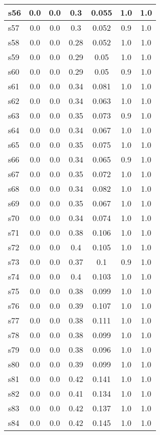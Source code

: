 \documentclass{article}
\begin{document}
\begin{tabular}{|l|c|c|c|c|c|c|}
\hline
s56 &0.0 & 0.0 & 0.3 & 0.055 & 1.0 & 1.0\\
\hline
s57 &0.0 & 0.0 & 0.3 & 0.052 & 0.9 & 1.0\\
\hline
s58 &0.0 & 0.0 & 0.28 & 0.052 & 1.0 & 1.0\\
\hline
s59 &0.0 & 0.0 & 0.29 & 0.05 & 1.0 & 1.0\\
\hline
s60 &0.0 & 0.0 & 0.29 & 0.05 & 0.9 & 1.0\\
\hline
s61 &0.0 & 0.0 & 0.34 & 0.081 & 1.0 & 1.0\\
\hline
s62 &0.0 & 0.0 & 0.34 & 0.063 & 1.0 & 1.0\\
\hline
s63 &0.0 & 0.0 & 0.35 & 0.073 & 0.9 & 1.0\\
\hline
s64 &0.0 & 0.0 & 0.34 & 0.067 & 1.0 & 1.0\\
\hline
s65 &0.0 & 0.0 & 0.35 & 0.075 & 1.0 & 1.0\\
\hline
s66 &0.0 & 0.0 & 0.34 & 0.065 & 0.9 & 1.0\\
\hline
s67 &0.0 & 0.0 & 0.35 & 0.072 & 1.0 & 1.0\\
\hline
s68 &0.0 & 0.0 & 0.34 & 0.082 & 1.0 & 1.0\\
\hline
s69 &0.0 & 0.0 & 0.35 & 0.067 & 1.0 & 1.0\\
\hline
s70 &0.0 & 0.0 & 0.34 & 0.074 & 1.0 & 1.0\\
\hline
s71 &0.0 & 0.0 & 0.38 & 0.106 & 1.0 & 1.0\\
\hline
s72 &0.0 & 0.0 & 0.4 & 0.105 & 1.0 & 1.0\\
\hline
s73 &0.0 & 0.0 & 0.37 & 0.1 & 0.9 & 1.0\\
\hline
s74 &0.0 & 0.0 & 0.4 & 0.103 & 1.0 & 1.0\\
\hline
s75 &0.0 & 0.0 & 0.38 & 0.099 & 1.0 & 1.0\\
\hline
s76 &0.0 & 0.0 & 0.39 & 0.107 & 1.0 & 1.0\\
\hline
s77 &0.0 & 0.0 & 0.38 & 0.111 & 1.0 & 1.0\\
\hline
s78 &0.0 & 0.0 & 0.38 & 0.099 & 1.0 & 1.0\\
\hline
s79 &0.0 & 0.0 & 0.38 & 0.096 & 1.0 & 1.0\\
\hline
s80 &0.0 & 0.0 & 0.39 & 0.099 & 1.0 & 1.0\\
\hline
s81 &0.0 & 0.0 & 0.42 & 0.141 & 1.0 & 1.0\\
\hline
s82 &0.0 & 0.0 & 0.41 & 0.134 & 1.0 & 1.0\\
\hline
s83 &0.0 & 0.0 & 0.42 & 0.137 & 1.0 & 1.0\\
\hline
s84 &0.0 & 0.0 & 0.42 & 0.145 & 1.0 & 1.0\\

\end{tabular}
\end{document}
